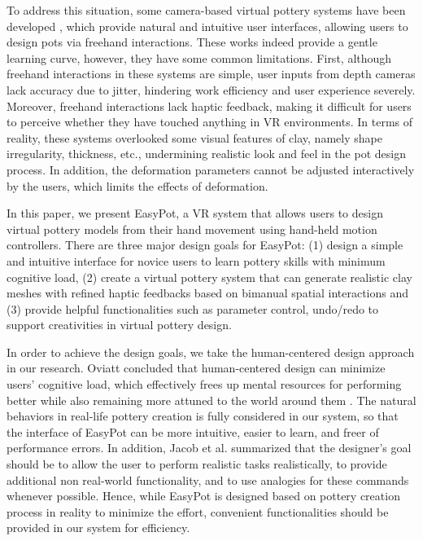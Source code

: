 \documentclass{svjour3}                     %
\begin{document}
To address this situation, some camera-based virtual pottery systems have been developed \cite{ramani2015gesture,murugappan2013handy,han2014virtual}, which provide natural and intuitive user interfaces, allowing users to design pots via freehand interactions.
These works indeed provide a gentle learning curve, however, they have some common limitations.
First, although freehand interactions in these systems are simple, user inputs from depth cameras lack accuracy due to jitter, hindering work efficiency and user experience severely.
%
Moreover, freehand interactions lack haptic feedback, making it difficult for users to perceive whether they have touched anything in VR environments. In terms of reality, these systems overlooked some visual features of clay, namely shape irregularity, thickness, etc., undermining realistic look and feel in the pot design process.
%
In addition, the deformation parameters cannot be adjusted interactively by the users, which limits the effects of deformation.

In this paper, we present EasyPot, a VR system that allows users to design virtual pottery models from their hand movement using hand-held motion controllers. There are three major design goals for EasyPot:
(1) design a simple and intuitive interface for novice users to learn pottery skills with minimum cognitive load,
(2) create a virtual pottery system that can generate realistic clay meshes with refined haptic feedbacks based on bimanual spatial interactions 
and (3) provide helpful functionalities such as parameter control, undo/redo to support creativities in virtual pottery design.

In order to achieve the design goals, we take the human-centered design approach in our research.
Oviatt concluded that human-centered design can minimize users’ cognitive load, which effectively frees up mental resources for performing better while also remaining more attuned to the world around them \cite{oviatt2006human}.
The natural behaviors in real-life pottery creation is fully considered in our system, so that the interface of EasyPot can be more intuitive, easier to learn, and freer of performance errors.
In addition, Jacob et al. \cite{Jacob2008Reality} summarized that the designer's goal should be to allow the user to perform realistic tasks realistically, to provide additional non real-world functionality, and to use analogies for these commands whenever possible.
Hence, while EasyPot is designed based on pottery creation process in reality to minimize the effort, convenient functionalities should be provided in our system for efficiency.
\end{document}
